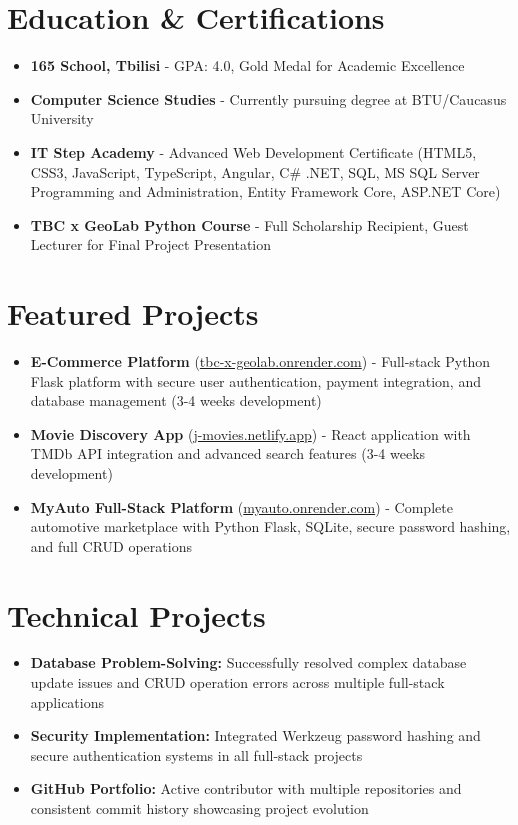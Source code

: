 \documentclass{article}
\begin{document}
\section{Education \& Certifications}
\begin{itemize}[leftmargin=*, itemsep=0pt]
\item \textbf{165 School, Tbilisi} - GPA: 4.0, Gold Medal for Academic Excellence
\item \textbf{Computer Science Studies} - Currently pursuing degree at BTU/Caucasus University
\item \textbf{IT Step Academy} - Advanced Web Development Certificate (HTML5, CSS3, JavaScript, TypeScript, Angular, C\# .NET, SQL, MS SQL Server Programming and Administration, Entity Framework Core, ASP.NET Core)
\item \textbf{TBC x GeoLab Python Course} - Full Scholarship Recipient, Guest Lecturer for Final Project Presentation
\end{itemize}

\section{Featured Projects}
\begin{itemize}[leftmargin=*, itemsep=0pt]
\item \textbf{E-Commerce Platform} (\href{https://tbc-x-geolab.onrender.com}{tbc-x-geolab.onrender.com}) - Full-stack Python Flask platform with secure user authentication, payment integration, and database management (3-4 weeks development)
\item \textbf{Movie Discovery App} (\href{https://j-movies.netlify.app}{j-movies.netlify.app}) - React application with TMDb API integration and advanced search features (3-4 weeks development)
\item \textbf{MyAuto Full-Stack Platform} (\href{https://myauto.onrender.com}{myauto.onrender.com}) - Complete automotive marketplace with Python Flask, SQLite, secure password hashing, and full CRUD operations
\end{itemize}

\section{Technical Projects}
\begin{itemize}[leftmargin=*, itemsep=0pt]
\item \textbf{Database Problem-Solving:} Successfully resolved complex database update issues and CRUD operation errors across multiple full-stack applications
\item \textbf{Security Implementation:} Integrated Werkzeug password hashing and secure authentication systems in all full-stack projects
\item \textbf{GitHub Portfolio:} Active contributor with multiple repositories and consistent commit history showcasing project evolution
\end{itemize}
\end{document}
